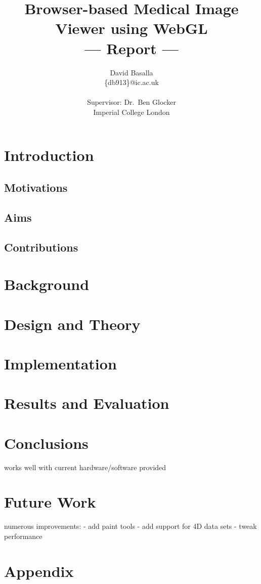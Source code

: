 \documentclass[a4paper,11pt,titlepage]{article}
\title{Browser-based Medical Image Viewer using WebGL \\\Large{--- Report ---}}
\author{David Basalla\\
       \{db913\}@ic.ac.uk\\ \\
       \small{Supervisor: Dr.\ Ben Glocker}\\
       \small{Imperial College London}
}
\begin{document}
\maketitle



\section{Introduction}

\subsection{Motivations}

\subsection{Aims}

\subsection{Contributions}


\section{Background}



\section{Design and Theory}


\section{Implementation}


\section{Results and Evaluation}



\section{Conclusions}

works well with current hardware/software provided


\section{Future Work}

numerous improvements:
- add paint tools
- add support for 4D data sets
- tweak performance











\newpage

  \begin{thebibliography}{1}

  \end{thebibliography}

\newpage

\section{Appendix}
\end{document}
